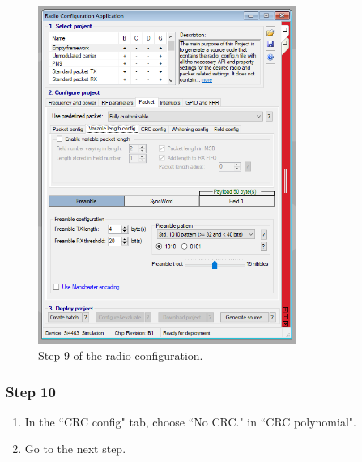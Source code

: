 \begin{figure}[!h]
	\begin{center}
		\includegraphics[width=0.75\textwidth]{figures/wds-tutorial-9.png}
		\caption{Step 9 of the radio configuration.}
		\label{fig:wds-tutorial-step-9}
	\end{center}
\end{figure}

\subsubsection{Step 10}

\begin{enumerate}
    \item In the ``CRC config" tab, choose ``No CRC." in ``CRC polynomial".
    \item Go to the next step.
\end{enumerate}

